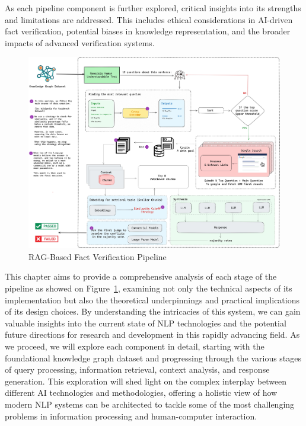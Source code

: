 As each pipeline component is further explored, critical insights into its strengths and limitations are addressed.
This includes ethical considerations in AI-driven fact verification, potential biases in knowledge representation, and the broader impacts of advanced verification systems.
\begin{figure}[ht!]
    \centering
    \begin{minipage}[b]{\textwidth}
        \centering
        \includegraphics[width=\textwidth]{res/pipeline}
        \caption{RAG-Based Fact Verification Pipeline}
        \label{fig:pipeline}
    \end{minipage}
\end{figure}

This chapter aims to provide a comprehensive analysis of each stage of the pipeline as showed on Figure~\ref{fig:pipeline}, examining not only the technical aspects of its implementation but also the theoretical underpinnings and practical implications of its design choices.
By understanding the intricacies of this system, we can gain valuable insights into the current state of NLP technologies and the potential future directions for research and development in this rapidly advancing field.
As we proceed, we will explore each component in detail, starting with the foundational knowledge graph dataset and progressing through the various stages of query processing, information retrieval, context analysis, and response generation.
This exploration will shed light on the complex interplay between different AI technologies and methodologies, offering a holistic view of how modern NLP systems can be architected to tackle some of the most challenging problems in information processing and human-computer interaction.

